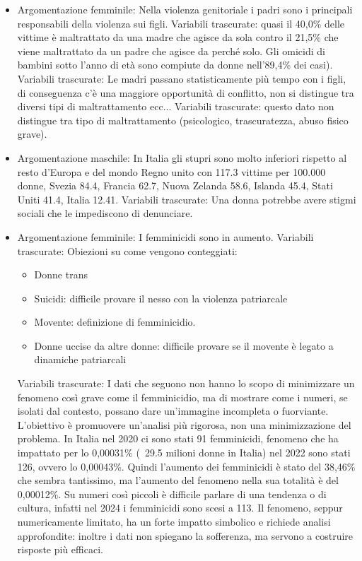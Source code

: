 \documentclass[12pt]{book} %
\begin{document}
\begin{mdframed}[linewidth=1pt]
\begin{itemize}
\item Argomentazione femminile: Nella violenza genitoriale i padri sono i principali responsabili della violenza sui figli.
Variabili trascurate: quasi il 40,0\% delle vittime è maltrattato da una madre che agisce da sola contro il 21,5\% che viene maltrattato da un padre che agisce da perché solo. Gli omicidi di bambini sotto l'anno di età sono compiute da donne nell'89,4\% dei casi).
Variabili trascurate: Le madri passano statisticamente più tempo con i figli, di conseguenza c'è una maggiore opportunità di conflitto, non si distingue tra diversi tipi di maltrattamento ecc...
Variabili trascurate: questo dato non distingue tra tipo di maltrattamento (psicologico, trascuratezza, abuso fisico grave).
\item Argomentazione maschile: In Italia gli stupri sono molto inferiori rispetto al resto d'Europa e del mondo  Regno unito con 117.3 vittime per 100.000 donne, Svezia 84.4, Francia 62.7, Nuova Zelanda 58.6, Islanda 45.4, Stati Uniti 41.4, Italia 12.41.
Variabili trascurate: Una donna potrebbe avere stigmi sociali che le impediscono di denunciare.
\item Argomentazione femminile: I femminicidi sono in aumento.
Variabili trascurate: Obiezioni su come vengono conteggiati:
\begin{itemize}
\item Donne trans
\item Suicidi: difficile provare il nesso con la violenza patriarcale
\item Movente: definizione di femminicidio.
\item Donne uccise da altre donne: difficile provare se il movente è legato a dinamiche patriarcali
\end{itemize}
Variabili trascurate: I dati che seguono non hanno lo scopo di minimizzare un fenomeno così grave come il femminicidio, ma di mostrare come i numeri, se isolati dal contesto, possano dare un’immagine incompleta o fuorviante. L’obiettivo è promuovere un’analisi più rigorosa, non una minimizzazione del problema.
In Italia nel 2020 ci sono stati 91 femminicidi, fenomeno che ha impattato per lo 0,00031\% (~29.5 milioni donne in Italia) nel 2022 sono stati 126, ovvero lo 0,00043\%. Quindi l'aumento dei femminicidi è stato del 38,46\% che sembra tantissimo, ma l'aumento del fenomeno nella sua totalità è del 0,00012\%. Su numeri così piccoli è difficile parlare di una tendenza o di cultura, infatti nel 2024 i femminicidi sono scesi a 113. Il fenomeno, seppur numericamente limitato, ha un forte impatto simbolico e richiede analisi approfondite: inoltre i dati non spiegano la sofferenza, ma servono a costruire risposte più efficaci.

\end{itemize}
\end{mdframed}
\end{document}
